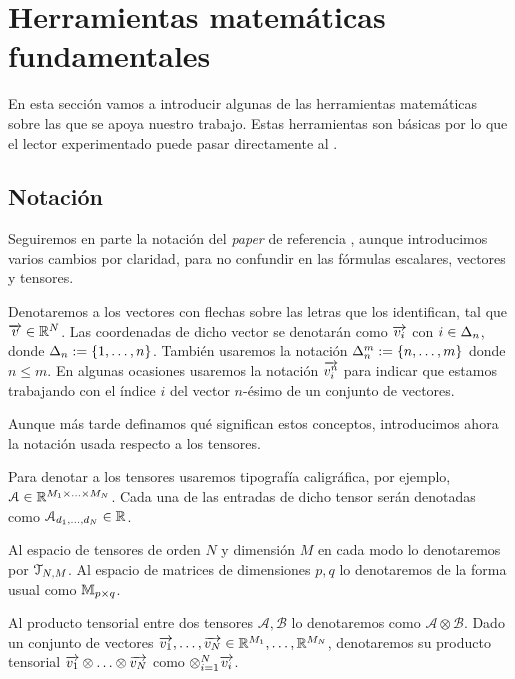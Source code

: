 
\chapter{Herramientas matemáticas fundamentales} \label{ch:matematicas_fundamentales}

En esta sección vamos a introducir algunas de las herramientas matemáticas sobre las que se apoya nuestro trabajo. Estas herramientas son básicas por lo que el lector experimentado puede pasar directamente al .

\section{Notación}

Seguiremos en parte la notación del \textit{paper} de referencia \cite{matematicas:principal}, aunque introducimos varios cambios por claridad, para no confundir en las fórmulas escalares, vectores y tensores.

Denotaremos a los vectores con flechas sobre las letras que los identifican, tal que $\overrightarrow{v} \in \mathbb{R}^N$. Las coordenadas de dicho vector se denotarán como $\overrightarrow{v_i}$ con $i \in \Delta_{n}$, donde $\Delta_{n} := \{1, \ldots, n\}$. También usaremos la notación $\Delta_{n}^{m} := \{n, \ldots, m\}$ donde $n \leq m$. En algunas ocasiones usaremos la notación $\overrightarrow{v_i^n}$ para indicar que estamos trabajando con el índice $i$ del vector $n$-ésimo de un conjunto de vectores.

Aunque más tarde definamos qué significan estos conceptos, introducimos ahora la notación usada respecto a los tensores.

Para denotar a los tensores usaremos tipografía caligráfica, por ejemplo, $\mathcal{A} \in \mathbb{R}^{M_1 \times \ldots \times M_N}$. Cada una de las entradas de dicho tensor serán denotadas como $\mathcal{A}_{d_1, \ldots, d_N} \in \mathbb{R}$.

Al espacio de tensores de orden $N$ y dimensión $M$ en cada modo lo denotaremos por $\mathcal{T}_{N, M}$. Al espacio de matrices de dimensiones $p, q$ lo denotaremos de la forma usual como  $\mathbb{M}_{p \times q}$.

Al producto tensorial entre dos tensores $\mathcal{A}, \mathcal{B}$ lo denotaremos como $\mathcal{A} \otimes \mathcal{B}$. Dado un conjunto de vectores $\overrightarrow{v_1}, \ldots, \overrightarrow{v_N} \in \mathbb{R}^{M_1}, \ldots, \mathbb{R}^{M_N}$, denotaremos su producto tensorial $\overrightarrow{v_1} \otimes \ldots \otimes \overrightarrow{v_N}$ como $\otimes_{i = 1}^N \overrightarrow{v_i}$.

